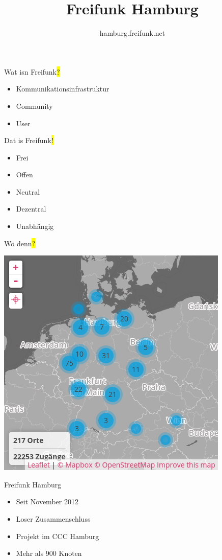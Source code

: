 \documentclass[t]{beamer}
\title{Freifunk Hamburg}
\author{hamburg.freifunk.net}
\date{}
\begin{document}
\maketitle

\begin{frame}{Wat isn Freifunk\hl{?}}
    \begin{itemize}
        \item Kommunikationsinfrastruktur
        \item Community
        \item User
    \end{itemize}
\end{frame}

\begin{frame}{Dat is Freifunk\hl{!}}
    \begin{itemize}
        \item Frei
        \item Offen
        \item Neutral
        \item Dezentral
        \item Unabhängig
    \end{itemize}
\end{frame}

\begin{frame}{Wo denn\hl{?}}
    \begin{center}
        \includegraphics[width=.5\textwidth]{Bilder/community-map-2015-10-16}
    \end{center}
\end{frame}

\begin{frame}{Freifunk Hamburg\ANKER{}}
    \begin{itemize}
        \item Seit November 2012
        \item Loser Zusammenschluss
        \item Projekt im CCC Hamburg
        \item Mehr als 900 Knoten
    \end{itemize}
\end{frame}
\end{document}
